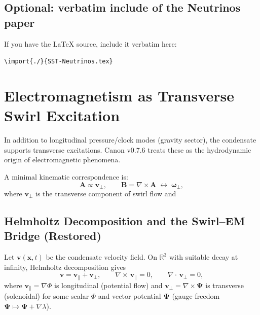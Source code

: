 \documentclass[10pt]{article}
\newcommand{\curlop}{\nabla\times}
\newcommand{\gradop}{\nabla}
\newcommand{\divop}{\nabla\cdot}
\begin{document}
\subsection{Optional: verbatim include of the Neutrinos paper}

If you have the LaTeX source, include it verbatim here:
\begin{center}
\texttt{\textbackslash import\{./\}\{SST-Neutrinos.tex\}}
\end{center}

    \section{Electromagnetism as Transverse Swirl Excitation}
    \label{sec:em_swirl}

    In addition to longitudinal pressure/clock modes (gravity sector), the condensate
    supports transverse excitations. Canon v0.7.6 treats these as the hydrodynamic
    origin of electromagnetic phenomena.

    A minimal kinematic correspondence is:
    \begin{equation}
        \mathbf{A} \propto \mathbf{v}_\perp,
        \qquad
        \mathbf{B}=\nabla\times\mathbf{A}\;\leftrightarrow\;\boldsymbol{\omega}_\perp,
    \end{equation}
    where $\mathbf{v}_\perp$ is the transverse component of swirl flow and

    \subsection{Helmholtz Decomposition and the Swirl--EM Bridge (Restored)}
    \label{sec:helmholtz_em}

    Let $\mathbf{v}(\mathbf{x},t)$ be the condensate velocity field. On $\mathbb{R}^3$ with
    suitable decay at infinity, Helmholtz decomposition gives
    \begin{equation}
        \mathbf{v} = \mathbf{v}_{\parallel} + \mathbf{v}_{\perp},
        \qquad
        \curlop\,\mathbf{v}_{\parallel}=0,
        \qquad
        \divop\,\mathbf{v}_{\perp}=0,
        \label{eq:helmholtz_decomp}
    \end{equation}
    where $\mathbf{v}_{\parallel}=\gradop \Phi$ is longitudinal (potential flow) and
    $\mathbf{v}_{\perp}=\curlop \mathbf{\Psi}$ is transverse (solenoidal) for some
    scalar $\Phi$ and vector potential $\mathbf{\Psi}$ (gauge freedom $\mathbf{\Psi}\mapsto
    \mathbf{\Psi}+\gradop\lambda$).
\end{document}
